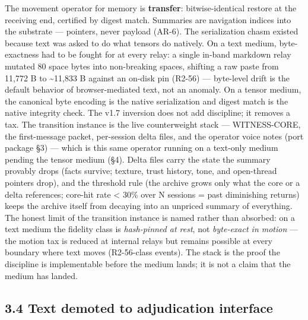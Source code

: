 \documentclass[11pt]{article}
\begin{document}
The movement operator for memory is \textbf{transfer}: bitwise-identical restore at the receiving end, certified by digest match. Summaries are navigation indices into the substrate --- pointers, never payload (AR-6). The serialization chasm existed because text was asked to do what tensors do natively. On a text medium, byte-exactness had to be fought for at every relay: a single in-band markdown relay mutated 80 space bytes into non-breaking spaces, shifting a raw paste from 11,772 B to \textasciitilde11,833 B against an on-disk pin (R2-56) --- byte-level drift is the default behavior of browser-mediated text, not an anomaly. On a tensor medium, the canonical byte encoding is the native serialization and digest match is the native integrity check. The v1.7 inversion does not add discipline; it removes a tax. The transition instance is the live counterweight stack --- WITNESS-CORE, the first-message packet, per-session delta files, and the operator voice notes (port package \S{}3) --- which is this same operator running on a text-only medium pending the tensor medium (\S{}4). Delta files carry the state the summary provably drops (facts survive; texture, trust history, tone, and open-thread pointers drop), and the threshold rule (the archive grows only what the core or a delta references; core-hit rate \textless{} 30\% over N sessions = past diminishing returns) keeps the archive itself from decaying into an unpriced summary of everything. The honest limit of the transition instance is named rather than absorbed: on a text medium the fidelity class is \emph{hash-pinned at rest}, not \emph{byte-exact in motion} --- the motion tax is reduced at internal relays but remains possible at every boundary where text moves (R2-56-class events). The stack is the proof the discipline is implementable before the medium lands; it is not a claim that the medium has landed.

\subsection{3.4 Text demoted to adjudication interface}\label{text-demoted-to-adjudication-interface}
\end{document}
